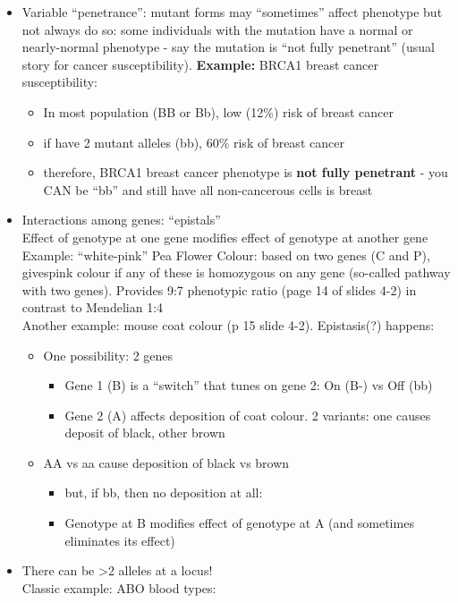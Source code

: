 \documentclass{scrartcl}
\begin{document}
\begin{itemize}
\item Variable ``penetrance'': mutant forms may ``sometimes'' affect phenotype but not always do so: some individuals with the mutation have a normal or nearly-normal phenotype - say the mutation is ``not fully penetrant'' (usual story for cancer susceptibility).
{\bf Example: } BRCA1 breast cancer susceptibility:
\begin{itemize}
\item In most population (BB or Bb), low (12\%) risk of breast cancer
\item if have 2 mutant alleles (bb), 60\% risk of breast cancer
\item therefore, BRCA1 breast cancer phenotype is {\bf not fully penetrant} - you CAN be ``bb'' and still have all non-cancerous cells is breast
\end{itemize}
\item Interactions among genes: ``epistals''\\
Effect of genotype at one gene modifies effect of genotype at another gene
Example: ``white-pink'' Pea Flower Colour: based on two genes (C and P), givespink colour if any of these is homozygous on any gene (so-called pathway with two genes). 
Provides 9:7 phenotypic ratio (page 14 of slides 4-2) in contrast to Mendelian 1:4\\
Another example: mouse coat colour (p 15 slide 4-2).
Epistasis(?) happens:
\begin{itemize}
\item One possibility: 2 genes
  \begin{itemize}
  \item Gene 1 (B) is a ``switch'' that tunes on gene 2: On (B-) vs Off (bb)
  \item Gene 2 (A) affects deposition of coat colour. 2 variants: one causes deposit of black, other brown
  \end{itemize}
\item AA vs aa cause deposition of black vs brown
  \begin{itemize}
  \item but, if bb, then no deposition at all:
  \item Genotype at B modifies effect of genotype at A (and sometimes eliminates its effect)
  \end{itemize}
\end{itemize}
\item There can be >2 alleles at a locus!\\
Classic example: ABO blood types:
\begin{itemize}

\end{itemize}
\end{itemize}
\end{document}
